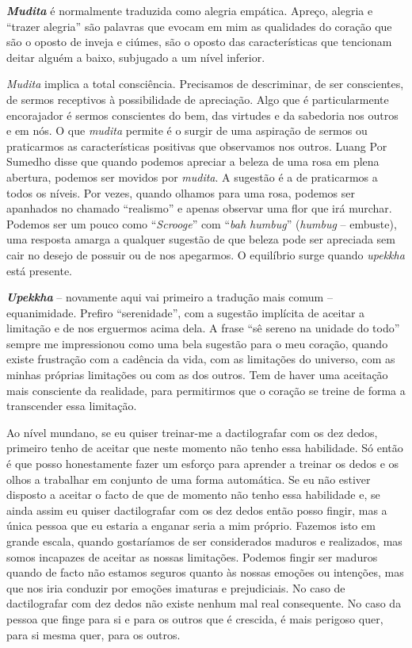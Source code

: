 \emph{\textbf{Mudita}} é normalmente traduzida como alegria empática. Apreço,
alegria e ``trazer alegria'' são palavras que evocam em mim as
qualidades do coração que são o oposto de inveja e ciúmes, são o oposto
das características que tencionam deitar alguém a baixo, subjugado a um
nível inferior.

\emph{Mudita} implica a total consciência. Precisamos de descriminar, de
ser conscientes, de sermos receptivos à possibilidade de apreciação.
Algo que é particularmente encorajador é sermos conscientes do bem, das
virtudes e da sabedoria nos outros e em nós. O que \emph{mudita} permite
é o surgir de uma aspiração de sermos ou praticarmos as características
positivas que observamos nos outros. Luang Por Sumedho disse que quando
podemos apreciar a beleza de uma rosa em plena abertura, podemos ser
movidos por \emph{mudita}. A sugestão é a de praticarmos a todos os
níveis. Por vezes, quando olhamos para uma rosa, podemos ser apanhados
no chamado ``realismo'' e apenas observar uma flor que irá murchar.
Podemos ser um pouco como ``\emph{Scrooge}'' com ``\emph{bah humbug}''
(\emph{humbug} -- embuste), uma resposta amarga a qualquer sugestão de
que beleza pode ser apreciada sem cair no desejo de possuir ou de nos
apegarmos. O equilíbrio surge quando \emph{upekkha} está presente.

\emph{\textbf{Upekkha}} -- novamente aqui vai primeiro a tradução mais comum --
equanimidade. Prefiro ``serenidade'', com a sugestão implícita de
aceitar a limitação e de nos erguermos acima dela. A frase ``sê sereno
na unidade do todo'' sempre me impressionou como uma bela sugestão para
o meu coração, quando existe frustração com a cadência da vida, com as
limitações do universo, com as minhas próprias limitações ou com as dos
outros. Tem de haver uma aceitação mais consciente da realidade, para
permitirmos que o coração se treine de forma a transcender essa
limitação.

Ao nível mundano, se eu quiser treinar-me a dactilografar com os dez
dedos, primeiro tenho de aceitar que neste momento não tenho essa
habilidade. Só então é que posso honestamente fazer um esforço para
aprender a treinar os dedos e os olhos a trabalhar em conjunto de uma
forma automática. Se eu não estiver disposto a aceitar o facto de que de
momento não tenho essa habilidade e, se ainda assim eu quiser
dactilografar com os dez dedos então posso fingir, mas a única pessoa
que eu estaria a enganar seria a mim próprio. Fazemos isto em grande
escala, quando gostaríamos de ser considerados maduros e realizados, mas
somos incapazes de aceitar as nossas limitações. Podemos fingir ser
maduros quando de facto não estamos seguros quanto às nossas emoções ou
intenções, mas que nos iria conduzir por emoções imaturas e
prejudiciais. No caso de dactilografar com dez dedos não existe nenhum
mal real consequente. No caso da pessoa que finge para si e para os
outros que é crescida, é mais perigoso quer, para si mesma quer, para os
outros.

